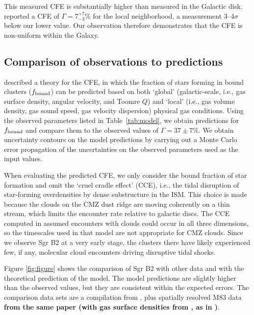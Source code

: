 \documentclass[twocolumn]{aastex62}
\def\referee#1{\textbf{#1}}
\begin{document}
This measured CFE is substantially higher than measured in the Galactic disk.
\citet{Lada2003a} reported a CFE of $\Gamma=7^{+7}_{-3}\%$ for the local neighborhood, a
measurement $3$--$4\sigma$ below our lower value.  Our observation therefore demonstrates
that the CFE is non-uniform within the Galaxy.

\subsection{Comparison of observations to predictions}
\citet{Kruijssen2012a} described a theory for the CFE, in which the fraction
of stars forming in bound clusters ($f_{\rm bound}$) can be predicted based on both
`global' (galactic-scale, i.e., gas surface density, angular velocity, and
Toomre $Q$) and `local' (i.e., gas volume density, gas sound speed, gas
velocity dispersion) physical gas conditions. Using the observed parameters
listed in Table~\ref{tab:model}, we obtain predictions for $f_{\rm bound}$ and
compare them to the observed values of $\Gamma=37\pm7\%$. We obtain uncertainty
contours on the model predictions by carrying out a Monte Carlo error
propagation of the uncertainties on the observed parameters used as the input
values.

When evaluating the predicted CFE, we only consider the bound fraction of star formation
and omit the `cruel cradle effect' (CCE), i.e., the tidal disruption of
star-forming overdensities by dense substructure in the ISM. This choice is
made because the clouds on the CMZ dust ridge are moving coherently on a thin
stream, which limits the encounter rate relative to galactic discs.  The CCE
computed in \citet{Kruijssen2012a} assumed encounters with clouds could occur
in all three dimensions, so the timescales used in that model are not
appropriate for CMZ clouds.  Since we observe Sgr B2 at a very early stage, the
clusters there have likely experienced few, if any, molecular cloud encounters
driving disruptive tidal shocks.

Figure \ref{fig:figure} shows the comparison of Sgr B2 with other data and with
the theoretical prediction of the \citet{Kruijssen2012a} model. The model
predictions are slightly higher than the observed values, but they are
consistent within the expected errors. The comparison data sets are a
compilation from \citet{Adamo2015a}, plus spatially resolved M83 data
\referee{from the same paper (with gas surface densities from
\citealt{Freeman2017a}, as in \citealt{Reina-Campos2017a})}.
\end{document}
